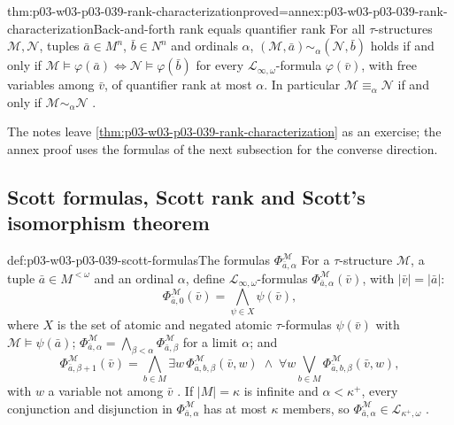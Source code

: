 \begin{hbtheorem}{thm:p03-w03-p03-039-rank-characterization}{proved=annex:p03-w03-p03-039-rank-characterization}{Back-and-forth rank equals quantifier rank}
For all \(\tau\)-structures \(\mathcal M,\mathcal N\), tuples
\(\bar a\in M^n\), \(\bar b\in N^n\) and ordinals \(\alpha\),
\((\mathcal M,\bar a)\sim_\alpha(\mathcal N,\bar b)\) holds if and only if
\(\mathcal M\models\varphi(\bar a)\Leftrightarrow\mathcal N\models\varphi(\bar b)\)
for every \(\mathcal L_{\infty,\omega}\)-formula \(\varphi(\bar v)\), with
free variables among \(\bar v\), of quantifier rank at most \(\alpha\). In
particular \(\mathcal M\equiv_\alpha\mathcal N\) if and only if
\(\mathcal M\sim_\alpha\mathcal N\)
\cite[Thm.~2.13 and Ex.~2.14, p.~16]{Marker2014InfinitaryNotes}.
\end{hbtheorem}

The notes leave \cref{thm:p03-w03-p03-039-rank-characterization} as an
exercise; the annex proof uses the formulas of the next subsection for the
converse direction.

\subsection{Scott formulas, Scott rank and Scott's isomorphism theorem}
\label{sec:p03-w03-p03-039-scott}

\begin{hbdefinition}{def:p03-w03-p03-039-scott-formulas}{The formulas \(\Phi^{\mathcal M}_{\bar a,\alpha}\)}
For a \(\tau\)-structure \(\mathcal M\), a tuple \(\bar a\in M^{<\omega}\) and
an ordinal \(\alpha\), define \(\mathcal L_{\infty,\omega}\)-formulas
\(\Phi^{\mathcal M}_{\bar a,\alpha}(\bar v)\), with \(\lvert\bar v\rvert=\lvert\bar a\rvert\):
\[
 \Phi^{\mathcal M}_{\bar a,0}(\bar v)=\bigwedge_{\psi\in X}\psi(\bar v),
\]
where \(X\) is the set of atomic and negated atomic \(\tau\)-formulas
\(\psi(\bar v)\) with \(\mathcal M\models\psi(\bar a)\);
\(\Phi^{\mathcal M}_{\bar a,\alpha}=\bigwedge_{\beta<\alpha}\Phi^{\mathcal M}_{\bar a,\beta}\)
for a limit \(\alpha\); and
\[
 \Phi^{\mathcal M}_{\bar a,\beta+1}(\bar v)=
 \bigwedge_{b\in M}\exists w\,\Phi^{\mathcal M}_{\bar a,b,\beta}(\bar v,w)
 \;\land\;
 \forall w\bigvee_{b\in M}\Phi^{\mathcal M}_{\bar a,b,\beta}(\bar v,w),
\]
with \(w\) a variable not among \(\bar v\)
\cite[p.~16]{Marker2014InfinitaryNotes}. If \(\lvert M\rvert=\kappa\) is
infinite and \(\alpha<\kappa^+\), every conjunction and disjunction in
\(\Phi^{\mathcal M}_{\bar a,\alpha}\) has at most \(\kappa\) members, so
\(\Phi^{\mathcal M}_{\bar a,\alpha}\in\mathcal L_{\kappa^+,\omega}\)
\cite[p.~19]{Marker2014InfinitaryNotes}.
\end{hbdefinition}

